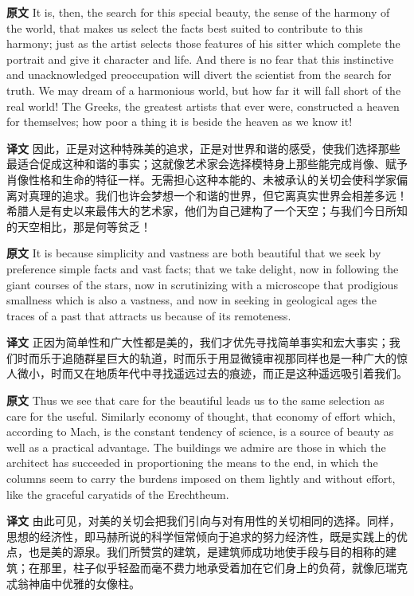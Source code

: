 \documentclass[UTF8,zihao=-4]{ctexart}
\newcommand{\BodyFont}{\fontsize{10.5pt}{15.5pt}\selectfont}
\newcommand{\origlabel}{\textbf{原文}\quad}
\newcommand{\translabel}{\textbf{译文}\quad}
\newenvironment{enblock}{\par\noindent\begingroup\BodyFont\origlabel}{\par\endgroup}
\newenvironment{zhblock}{\par\noindent\begingroup\BodyFont\translabel}{\par\endgroup\vspace{0.35em}}
\begin{document}
\begin{enblock}
It is, then, the search for this special beauty, the sense of the harmony of the world, that makes us select the facts best suited to contribute to this harmony; just as the artist selects those features of his sitter which complete the portrait and give it character and life. And there is no fear that this instinctive and unacknowledged preoccupation will divert the scientist from the search for truth. We may dream of a harmonious world, but how far it will fall short of the real world! The Greeks, the greatest artists that ever were, constructed a heaven for themselves; how poor a thing it is beside the heaven as we know it!
\end{enblock}
\begin{zhblock}
因此，正是对这种特殊美的追求，正是对世界和谐的感受，使我们选择那些最适合促成这种和谐的事实；这就像艺术家会选择模特身上那些能完成肖像、赋予肖像性格和生命的特征一样。无需担心这种本能的、未被承认的关切会使科学家偏离对真理的追求。我们也许会梦想一个和谐的世界，但它离真实世界会相差多远！希腊人是有史以来最伟大的艺术家，他们为自己建构了一个天空；与我们今日所知的天空相比，那是何等贫乏！
\end{zhblock}

\begin{enblock}
It is because simplicity and vastness are both beautiful that we seek by preference simple facts and vast facts; that we take delight, now in following the giant courses of the stars, now in scrutinizing with a microscope that prodigious smallness which is also a vastness, and now in seeking in geological ages the traces of a past that attracts us because of its remoteness.
\end{enblock}
\begin{zhblock}
正因为简单性和广大性都是美的，我们才优先寻找简单事实和宏大事实；我们时而乐于追随群星巨大的轨道，时而乐于用显微镜审视那同样也是一种广大的惊人微小，时而又在地质年代中寻找遥远过去的痕迹，而正是这种遥远吸引着我们。\end{zhblock}

\begin{enblock}
Thus we see that care for the beautiful leads us to the same selection as care for the useful. Similarly economy of thought, that economy of effort which, according to Mach, is the constant tendency of science, is a source of beauty as well as a practical advantage. The buildings we admire are those in which the architect has succeeded in proportioning the means to the end, in which the columns seem to carry the burdens imposed on them lightly and without effort, like the graceful caryatids of the Erechtheum.
\end{enblock}
\begin{zhblock}
由此可见，对美的关切会把我们引向与对有用性的关切相同的选择。同样，思想的经济性，即马赫所说的科学恒常倾向于追求的努力经济性，既是实践上的优点，也是美的源泉。我们所赞赏的建筑，是建筑师成功地使手段与目的相称的建筑；在那里，柱子似乎轻盈而毫不费力地承受着加在它们身上的负荷，就像厄瑞克忒翁神庙中优雅的女像柱。\end{zhblock}
\end{document}
